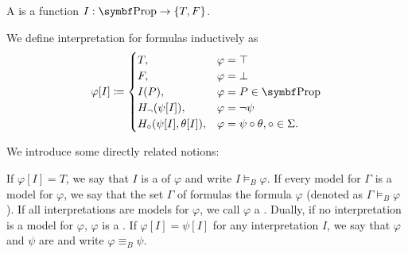 \begin{definition}\label{def:propositional_interpretation}
  A  is a function \( I: \Bold{Prop} \to \{ T, F \} \).

  We define interpretation for formulas inductively as
  \begin{align*}
    \varphi[I] \coloneqq \begin{cases}
      T,                           & \varphi = \top                                 \\
      F,                           & \varphi = \bot                                 \\
      I(P),                        & \varphi = P \in \Bold{Prop}                    \\
      H_\neg(\psi[I]),             & \varphi = \neg \psi                            \\
      H_\circ(\psi[I], \theta[I]), & \varphi = \psi \circ \theta, \circ \in \Sigma.
    \end{cases}
  \end{align*}

  We introduce some directly related notions:
  \begin{DefEnum}
     If \( \varphi[I] = T \), we say that \( I \) is a  of \( \varphi \) and write \( I \models_B \varphi \).
     If every model for \( \Gamma \) is a model for \( \varphi \), we say that the set \( \Gamma \) of formulas  the formula \( \varphi \) (denoted as \( \Gamma \models_B \varphi \)).
     If all interpretations are models for \( \varphi \), we call \( \varphi \) a .
     Dually, if no interpretation is a model for \( \varphi \), \( \varphi \) is a .
     If \( \varphi[I] = \psi[I] \) for any interpretation \( I \), we say that \( \varphi \) and \( \psi \) are  and write \( \varphi \equiv_B \psi \).
  \end{DefEnum}
\end{definition}

